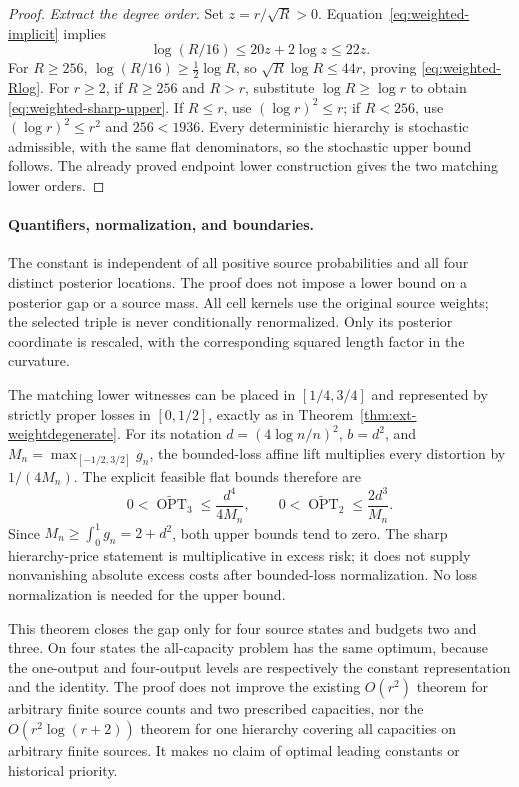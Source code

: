 \begin{proof}
\emph{Extract the degree order.}
Set $z=r/\sqrt R>0$. Equation~\eqref{eq:weighted-implicit} implies
\[
 \log(R/16)\le20z+2\log z\le22z.
\]
For $R\ge256$, $\log(R/16)\ge\tfrac12\log R$, so
$\sqrt R\log R\le44r$, proving \eqref{eq:weighted-Rlog}.
For $r\ge2$, if $R\ge256$ and $R>r$, substitute
$\log R\ge\log r$ to obtain \eqref{eq:weighted-sharp-upper}.
If $R\le r$, use $(\log r)^2\le r$; if $R<256$, use
$(\log r)^2\le r^2$ and $256<1936$.
Every deterministic hierarchy is stochastic admissible, with the same flat
denominators, so the stochastic upper bound follows. The already proved
endpoint lower construction gives the two matching lower orders.
\end{proof}

\paragraph{Quantifiers, normalization, and boundaries.}
The constant is independent of all positive source probabilities and all
four distinct posterior locations. The proof does not impose a lower bound
on a posterior gap or a source mass. All cell kernels use the original
source weights; the selected triple is never conditionally renormalized.
Only its posterior coordinate is rescaled, with the corresponding squared
length factor in the curvature.

The matching lower witnesses can be placed in $[1/4,3/4]$ and represented
by strictly proper losses in $[0,1/2]$, exactly as in
Theorem~\ref{thm:ext-weightdegenerate}. For its notation
$d=(4\log n/n)^2$, $b=d^2$, and
$M_n=\max_{[-1/2,3/2]}g_n$, the bounded-loss affine lift multiplies every
distortion by $1/(4M_n)$. The explicit feasible flat bounds therefore are
\[
 0<\widetilde{\operatorname{OPT}}_3
 \le\frac{d^4}{4M_n},\qquad
 0<\widetilde{\operatorname{OPT}}_2
 \le\frac{2d^3}{M_n}.
\]
Since $M_n\ge\int_0^1g_n=2+d^2$, both upper bounds tend to zero.
The sharp hierarchy-price statement is multiplicative in excess risk;
it does not supply nonvanishing absolute excess costs after bounded-loss
normalization. No loss normalization is needed for the upper bound.

This theorem closes the gap only for four source states and budgets two
and three. On four states the all-capacity problem has the same optimum,
because the one-output and four-output levels are respectively the constant
representation and the identity. The proof does not improve the existing
$O(r^2)$ theorem for arbitrary finite source counts and two prescribed
capacities, nor the $O(r^2\log(r+2))$ theorem for one hierarchy covering all
capacities on arbitrary finite sources. It makes no claim of optimal
leading constants or historical priority.
